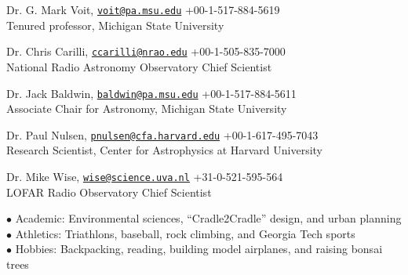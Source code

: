 \documentclass[12pt]{cv}
\begin{document}
\begin{llist}
Dr. G. Mark Voit, \href{mailto:voit@pa.msu.edu}{\tt voit@pa.msu.edu} \hfill +00-1-517-884-5619\\
Tenured professor, Michigan State University

Dr. Chris Carilli, \href{mailto:ccarilli@nrao.edu}{\tt ccarilli@nrao.edu} \hfill +00-1-505-835-7000\\
National Radio Astronomy Observatory Chief Scientist

Dr. Jack Baldwin, \href{mailto:baldwin@pa.msu.edu}{\tt baldwin@pa.msu.edu} \hfill +00-1-517-884-5611\\
Associate Chair for Astronomy, Michigan State University

Dr. Paul Nulsen, \href{mailto:pnulsen@cfa.harvard.edu}{\tt pnulsen@cfa.harvard.edu} \hfill +00-1-617-495-7043\\
Research Scientist, Center for Astrophysics at Harvard University

Dr. Mike Wise, \href{mailto:wise@science.uva.nl}{\tt wise@science.uva.nl} \hfill +31-0-521-595-564\\
LOFAR Radio Observatory Chief Scientist


$\bullet$ Academic: Environmental sciences, ``Cradle2Cradle'' design, and urban planning\\
$\bullet$ Athletics: Triathlons, baseball, rock climbing, and Georgia Tech sports\\
$\bullet$ Hobbies: Backpacking, reading, building model airplanes, and raising bonsai trees\\

\end{llist}
\end{document}
